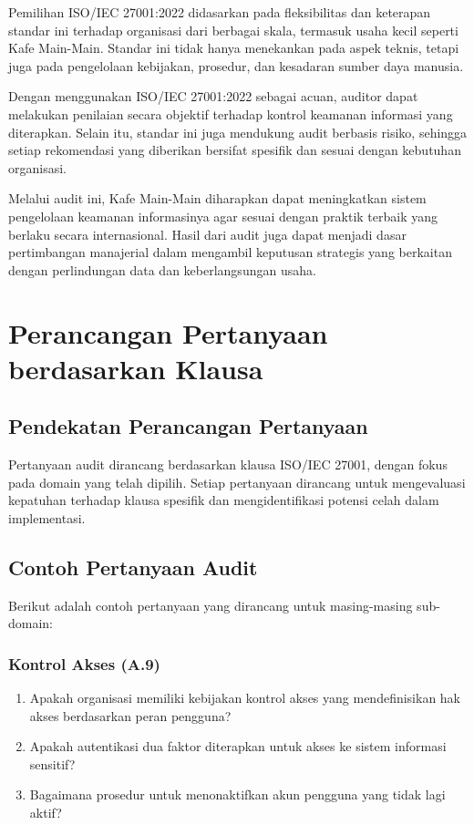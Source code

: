 \documentclass[12pt, a4paper]{report}
\begin{document}
Pemilihan ISO/IEC 27001:2022 didasarkan pada fleksibilitas dan keterapan standar ini terhadap organisasi dari berbagai skala, termasuk usaha kecil seperti Kafe Main-Main. Standar ini tidak hanya menekankan pada aspek teknis, tetapi juga pada pengelolaan kebijakan, prosedur, dan kesadaran sumber daya manusia.

Dengan menggunakan ISO/IEC 27001:2022 sebagai acuan, auditor dapat melakukan penilaian secara objektif terhadap kontrol keamanan informasi yang diterapkan. Selain itu, standar ini juga mendukung audit berbasis risiko, sehingga setiap rekomendasi yang diberikan bersifat spesifik dan sesuai dengan kebutuhan organisasi.

Melalui audit ini, Kafe Main-Main diharapkan dapat meningkatkan sistem pengelolaan keamanan informasinya agar sesuai dengan praktik terbaik yang berlaku secara internasional. Hasil dari audit juga dapat menjadi dasar pertimbangan manajerial dalam mengambil keputusan strategis yang berkaitan dengan perlindungan data dan keberlangsungan usaha.


\chapter{Perancangan Pertanyaan berdasarkan Klausa}
\label{bab:pertanyaan}

\section{Pendekatan Perancangan Pertanyaan}
Pertanyaan audit dirancang berdasarkan klausa ISO/IEC 27001, dengan fokus pada domain yang telah dipilih. Setiap pertanyaan dirancang untuk mengevaluasi kepatuhan terhadap klausa spesifik dan mengidentifikasi potensi celah dalam implementasi.

\section{Contoh Pertanyaan Audit}
Berikut adalah contoh pertanyaan yang dirancang untuk masing-masing sub-domain:

\subsection{Kontrol Akses (A.9)}
\begin{enumerate}
    \item Apakah organisasi memiliki kebijakan kontrol akses yang mendefinisikan hak akses berdasarkan peran pengguna?
    \item Apakah autentikasi dua faktor diterapkan untuk akses ke sistem informasi sensitif?
    \item Bagaimana prosedur untuk menonaktifkan akun pengguna yang tidak lagi aktif?
\end{enumerate}
\end{document}
